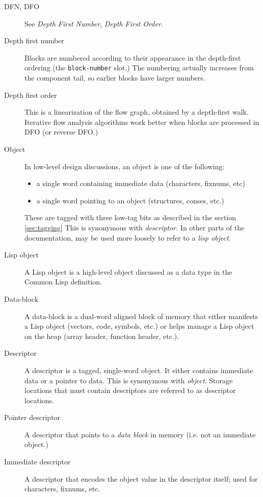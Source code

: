 \begin{description}
\item[DFN, DFO] See {\it Depth First Number}, {\it Depth First Order}.

\item[Depth first number] Blocks are numbered according to their appearance in
the depth-first ordering (the {\tt block-number} slot.)  The numbering actually
increases from the component tail, so earlier blocks have larger numbers.

\item[Depth first order] This is a linearization of the flow graph, obtained by
a depth-first walk.  Iterative flow analysis algorithms work better when blocks
are processed in DFO (or reverse DFO.)


\item[Object] In low-level design discussions, an object is one of the
following:
\begin{itemize}
\item a single word containing immediate data (characters, fixnums, etc)
\item a single word pointing to an object (structures, conses, etc.)
\end{itemize}
These are tagged with three low-tag bits as described in the section
\ref{sec:tagging} This is synonymous with {\it descriptor}.
In other parts of the documentation, may be used more loosely to refer to a
{\it lisp object}.

\item[Lisp object]
A Lisp object is a high-level object discussed as a data type in the Common
Lisp definition.

\item[Data-block]
A data-block is a dual-word aligned block of memory that either manifests a
Lisp object (vectors, code, symbols, etc.) or helps manage a Lisp object on
the heap (array header, function header, etc.).

\item[Descriptor]
A descriptor is a tagged, single-word object.  It either contains immediate
data or a pointer to data.  This is synonymous with {\it object}.  Storage
locations that must contain descriptors are referred to as descriptor
locations.

\item[Pointer descriptor]
A descriptor that points to a {\it data block} in memory (i.e. not an immediate
object.)

\item[Immediate descriptor]
A descriptor that encodes the object value in the descriptor itself; used for
characters, fixnums, etc.


\end{description}
